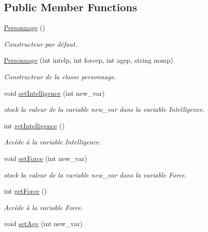 \subsection*{Public Member Functions}
\begin{DoxyCompactItemize}
\item 
\hyperlink{class_personnage_abec36eb0310adc71f3375297fc590c65}{Personnage} ()
\begin{DoxyCompactList}\small\item\em Constructeur par défaut. \end{DoxyCompactList}\item 
\hyperlink{class_personnage_aee7b1cf6fb3ae9c6dd9d834fb9a7557c}{Personnage} (int intelp, int forcep, int agep, string nomp)
\begin{DoxyCompactList}\small\item\em Constructeur de la classe personnage. \end{DoxyCompactList}\item 
void \hyperlink{class_personnage_af8b3c4f6c0f7035678d9ecf574976650}{set\-Intelligence} (int new\-\_\-var)
\begin{DoxyCompactList}\small\item\em stock la valeur de la variable new\-\_\-var dans la variable Intelligence. \end{DoxyCompactList}\item 
int \hyperlink{class_personnage_a250eec1aba0df7a105dd564e4cd02b0b}{get\-Intelligence} ()
\begin{DoxyCompactList}\small\item\em Accède à la variable Intelligence. \end{DoxyCompactList}\item 
void \hyperlink{class_personnage_a6745d147720906f2c85ddce11981d71f}{set\-Force} (int new\-\_\-var)
\begin{DoxyCompactList}\small\item\em stock la valeur de la variable new\-\_\-var dans la variable Force. \end{DoxyCompactList}\item 
int \hyperlink{class_personnage_a40de0ba95f25eb6f1653b6a4183763ae}{get\-Force} ()
\begin{DoxyCompactList}\small\item\em Accède à la variable Force. \end{DoxyCompactList}\item 
void \hyperlink{class_personnage_a5d9ef278febb61a54c8d61e9eff79aa4}{set\-Age} (int new\-\_\-var)

\end{DoxyCompactItemize}
